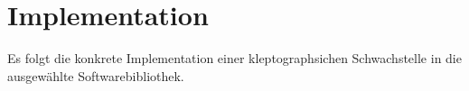 \chapter{Implementation}
    Es folgt die konkrete Implementation einer kleptographsichen Schwachstelle in die ausgewählte Softwarebibliothek.